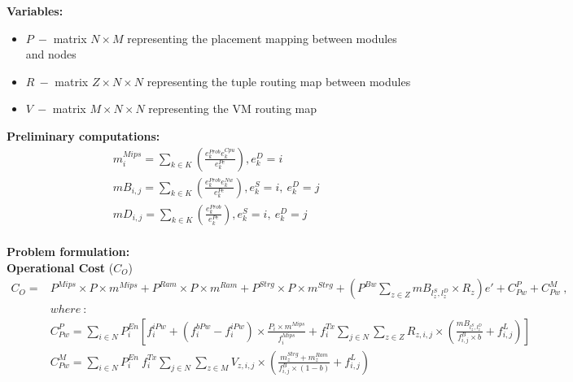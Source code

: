 \documentclass{article}
\begin{document}
\pagebreak
\noindent\textbf{Variables:}
\begin{itemize}
	\item $P~-$ matrix $N\times M$ representing the placement mapping between modules and nodes
	\item $R~-$ matrix $Z\times N\times N$ representing the tuple routing map between modules
	\item $V~-$ matrix $M\times N\times N$ representing the VM routing map
\end{itemize}
\vspace*{12pt}

\noindent\textbf{Preliminary computations:}\\[6pt]
\begin{equation*}
\begin{split}
& m^{Mips}_{i} = \sum_{k\in K} \left(\frac{e^{Prob}_k e^{Cpu}_k}{e^{Pe}_k}\right), e_k^{D} = i\\[6pt]
& mB_{i,j}= \sum_{k\in K} \left(\frac{e^{Prob}_k e^{Nw}_k}{e^{Pe}_k}\right), e^{S}_k = i,~e^{D}_k = j\\[6pt]
& mD_{i,j}= \sum_{k\in K} \left(\frac{e^{Prob}_k}{e^{Pe}_k}\right), e^{S}_k = i,~e^{D}_k = j
\end{split}
\end{equation*}\\[6pt]

\noindent\textbf{Problem formulation:}\\[12pt]
\noindent\textbf{Operational Cost} ($C_O$)\\[6pt]
\begin{equation*}
\begin{aligned}
	C_O = & P^{Mips} \times P \times m^{Mips} + P^{Ram} \times P \times m^{Ram} + P^{Strg}\times P\times m^{Strg} + \left(P^{Bw} \sum_{z\in Z} mB_{l^S_z,l^D_z} \times R_z\right)e' + C_{Pw}^P + C_{Pw}^M~,\\
	& where~ :\\
	& C_{Pw}^P = \sum_{i\in N} P^{En}_i \left[ f_i^{iPw} + (f_i^{bPw} - f_i^{iPw}) \times\frac{P_i \times m^{Mips}}{f_i^{Mips}} + f^{Tx}_{i} \sum_{j\in N}\sum_{z\in Z} R_{z, i,j} \times \left(\frac{ mB_{l^S_z,l^D_z}}{f^B_{i,j}\times b} + f^L_{i,j} \right) \right] \\[10pt]
	& C_{Pw}^M = \sum_{i\in N} P^{En}_i~ f^{Tx}_i \sum_{j\in N}\sum_{z\in M} V_{z, i,j} \times \left(\frac{m^{Strg}_{z} + m^{Ram}_{z}}{f^B_{i,j} \times (1- b)}  + f^L_{i,j}\right)
\end{aligned}
\end{equation*}\\[6pt]
\end{document}
